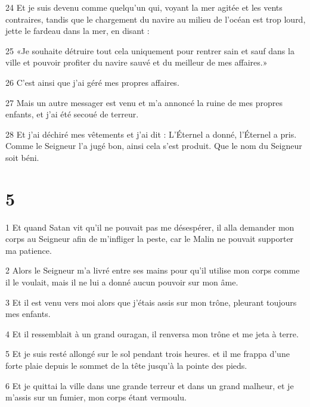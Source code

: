 \par 24 Et je suis devenu comme quelqu'un qui, voyant la mer agitée et les vents contraires, tandis que le chargement du navire au milieu de l'océan est trop lourd, jette le fardeau dans la mer, en disant :

\par 25 «Je souhaite détruire tout cela uniquement pour rentrer sain et sauf dans la ville et pouvoir profiter du navire sauvé et du meilleur de mes affaires.»

\par 26 C'est ainsi que j'ai géré mes propres affaires.

\par 27 Mais un autre messager est venu et m'a annoncé la ruine de mes propres enfants, et j'ai été secoué de terreur.

\par 28 Et j'ai déchiré mes vêtements et j'ai dit : L'Éternel a donné, l'Éternel a pris. Comme le Seigneur l’a jugé bon, ainsi cela s’est produit. Que le nom du Seigneur soit béni.

\chapter{5}

\par 1 Et quand Satan vit qu'il ne pouvait pas me désespérer, il alla demander mon corps au Seigneur afin de m'infliger la peste, car le Malin ne pouvait supporter ma patience.

\par 2 Alors le Seigneur m'a livré entre ses mains pour qu'il utilise mon corps comme il le voulait, mais il ne lui a donné aucun pouvoir sur mon âme.

\par 3 Et il est venu vers moi alors que j'étais assis sur mon trône, pleurant toujours mes enfants.

\par 4 Et il ressemblait à un grand ouragan, il renversa mon trône et me jeta à terre.

\par 5 Et je suis resté allongé sur le sol pendant trois heures. et il me frappa d'une forte plaie depuis le sommet de la tête jusqu'à la pointe des pieds.

\par 6 Et je quittai la ville dans une grande terreur et dans un grand malheur, et je m'assis sur un fumier, mon corps étant vermoulu.

